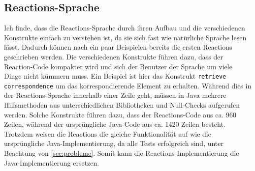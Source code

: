 \documentclass[ngerman,runningheads]{llncs}
\begin{document}
\subsection{Reactions-Sprache}
\label{sec:reaction}
Ich finde, dass die Reactions-Sprache durch ihren Aufbau und die verschiedenen Konstrukte einfach zu verstehen ist, da sie sich fast wie natürliche Sprache lesen lässt. Dadurch können nach ein paar Beispielen bereits die ersten Reactions geschrieben werden. Die verschiedenen Konstrukte führen dazu, dass der Reaction-Code kompakter wird und sich der Benutzer der Sprache um viele Dinge nicht kümmern muss. Ein Beispiel ist hier das Konstrukt \texttt{retrieve correspondence} um das korrespondierende Element zu erhalten. Während dies in der Reactions-Sprache innerhalb einer Zeile geht, müssen in Java mehrere Hilfsmethoden aus unterschiedlichen Bibliotheken und Null-Checks aufgerufen werden. Solche Konstrukte führen dazu, dass der Reactions-Code aus ca. 960 Zeilen, während der ursprüngliche Java-Code aus ca. 1420 Zeilen besteht. Trotzdem weisen die Reactions die gleiche Funktionalität auf wie die ursprüngliche Java-Implementierung, da alle Tests erfolgreich sind, unter Beachtung von \autoref{sec:probleme}. Somit kann die Reactions-Implementierung die Java-Implementierung ersetzen. \par
\end{document}
